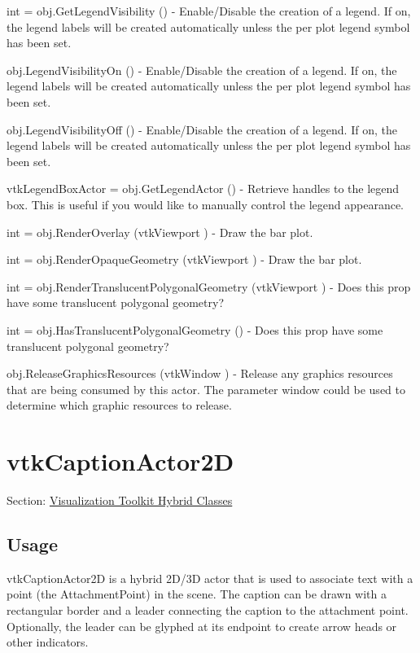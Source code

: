 \begin{DoxyItemize}
\item {\ttfamily int = obj.\-Get\-Legend\-Visibility ()} -\/ Enable/\-Disable the creation of a legend. If on, the legend labels will be created automatically unless the per plot legend symbol has been set.  
\item {\ttfamily obj.\-Legend\-Visibility\-On ()} -\/ Enable/\-Disable the creation of a legend. If on, the legend labels will be created automatically unless the per plot legend symbol has been set.  
\item {\ttfamily obj.\-Legend\-Visibility\-Off ()} -\/ Enable/\-Disable the creation of a legend. If on, the legend labels will be created automatically unless the per plot legend symbol has been set.  
\item {\ttfamily vtk\-Legend\-Box\-Actor = obj.\-Get\-Legend\-Actor ()} -\/ Retrieve handles to the legend box. This is useful if you would like to manually control the legend appearance.  
\item {\ttfamily int = obj.\-Render\-Overlay (vtk\-Viewport )} -\/ Draw the bar plot.  
\item {\ttfamily int = obj.\-Render\-Opaque\-Geometry (vtk\-Viewport )} -\/ Draw the bar plot.  
\item {\ttfamily int = obj.\-Render\-Translucent\-Polygonal\-Geometry (vtk\-Viewport )} -\/ Does this prop have some translucent polygonal geometry?  
\item {\ttfamily int = obj.\-Has\-Translucent\-Polygonal\-Geometry ()} -\/ Does this prop have some translucent polygonal geometry?  
\item {\ttfamily obj.\-Release\-Graphics\-Resources (vtk\-Window )} -\/ Release any graphics resources that are being consumed by this actor. The parameter window could be used to determine which graphic resources to release.  
\end{DoxyItemize}\hypertarget{vtkhybrid_vtkcaptionactor2d}{}\section{vtk\-Caption\-Actor2\-D}\label{vtkhybrid_vtkcaptionactor2d}
Section\-: \hyperlink{sec_vtkhybrid}{Visualization Toolkit Hybrid Classes} \hypertarget{vtkwidgets_vtkxyplotwidget_Usage}{}\subsection{Usage}\label{vtkwidgets_vtkxyplotwidget_Usage}
vtk\-Caption\-Actor2\-D is a hybrid 2\-D/3\-D actor that is used to associate text with a point (the Attachment\-Point) in the scene. The caption can be drawn with a rectangular border and a leader connecting the caption to the attachment point. Optionally, the leader can be glyphed at its endpoint to create arrow heads or other indicators.

